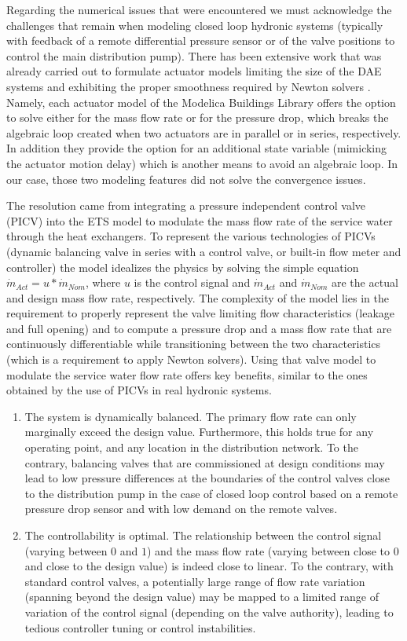 \begin{appendix}
Regarding the numerical issues that were encountered we must acknowledge the challenges that remain when modeling closed loop hydronic systems (typically with feedback of a remote differential pressure sensor or of the valve positions to control the main distribution pump).
There has been extensive work that was already carried out to formulate actuator models limiting the size of the DAE systems and exhibiting the proper smoothness required by Newton solvers \cite{Jorissen2015}.
Namely, each actuator model of the Modelica Buildings Library offers the option to solve either for the mass flow rate or for the pressure drop, which breaks the algebraic loop created when two actuators are in parallel or in series, respectively. In addition they provide the option for an additional state variable (mimicking the actuator motion delay) which is another means to avoid an algebraic loop.
In our case, those two modeling features did not solve the convergence issues.

The resolution came from integrating a pressure independent control valve (PICV) into the ETS model to modulate the mass flow rate of the service water through the heat exchangers.
To represent the various technologies of PICVs (dynamic balancing valve in series with a control valve, or built-in flow meter and controller) the model idealizes the physics by solving the simple equation $ \dot{m}_{Act} = u * \dot{m}_{Nom} $, where $u$ is the control signal and $\dot{m}_{Act}$ and $\dot{m}_{Nom}$ are the actual and design mass flow rate, respectively.
The complexity of the model lies in the requirement to properly represent the valve limiting flow characteristics (leakage and full opening) and to compute a pressure drop and a mass flow rate that are continuously differentiable while transitioning between the two characteristics (which is a requirement to apply Newton solvers).
Using that valve model to modulate the service water flow rate offers  key benefits, similar to the ones obtained by the use of PICVs in real hydronic systems.
\begin{enumerate}
    \item The system is dynamically balanced. The primary flow rate can only marginally exceed the design value. Furthermore, this holds true for any operating point, and any location in the distribution network. To the contrary, balancing valves that are commissioned at design conditions may lead to low pressure differences at the boundaries of the control valves close to the distribution pump in the case of closed loop control based on a remote pressure drop sensor and with low demand on the remote valves.
    \item The controllability is optimal. The relationship between the control signal (varying between $0$ and $1$) and the mass flow rate (varying between close to $0$ and close to the design value) is indeed close to linear. To the contrary, with standard control valves, a potentially large range of flow rate variation (spanning beyond the design value) may be mapped to a limited range of variation of the control signal (depending on the valve authority), leading to tedious controller tuning or control instabilities.
\end{enumerate}


\end{appendix}
